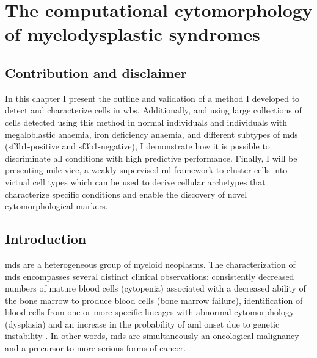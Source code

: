 \chapter{The computational cytomorphology of myelodysplastic syndromes}

\section{Contribution and disclaimer}

In this chapter I present the outline and validation of a method I developed to detect and characterize cells in \ac{wbs}. Additionally, and using large collections of cells detected using this method in normal individuals and individuals with megaloblastic anaemia, iron deficiency anaemia, and different subtypes of \ac{mds} (\ac{sf3b1}-positive and \ac{sf3b1}-negative), I demonstrate how it is possible to discriminate all conditions with high predictive performance. Finally, I will be presenting \ac{mile-vice}, a weakly-supervised \ac{ml} framework to cluster cells into virtual cell types which can be used to derive cellular archetypes that characterize specific conditions and enable the discovery of novel cytomorphological markers.

\section{Introduction}

\ac{mds} are a heterogeneous group of myeloid neoplasms. The characterization of \ac{mds} encompasses several distinct clinical observations: consistently decreased numbers of mature blood cells (cytopenia) associated with a decreased ability of the bone marrow to produce blood cells (bone marrow failure), identification of blood cells from one or more specific lineages with abnormal cytomorphology (dysplasia) and an increase in the probability of \ac{aml} onset due to genetic instability \cite{Valent2017-uh,Hofmann2005-vv,Aster2020-cu}. In other words, \ac{mds} are simultaneously an oncological malignancy and a precursor to more serious forms of cancer.

